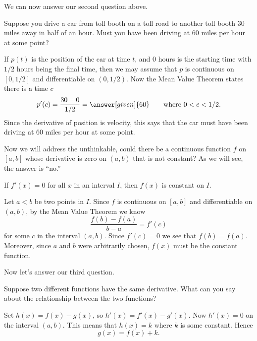 \documentclass{ximera}
\begin{document}
We can now answer our second question above.  

\begin{example}
Suppose you drive a car from toll booth on a toll road to another toll
booth $30$ miles away in half of an hour. Must you have been driving
at $60$ miles per hour at some point?

\begin{explanation}
If $p(t)$ is the position of the car at time $t$, and $0$ hours is the
starting time with $1/2$ hours being the final time, then we may
assume that $p$ is continuous on $[0,1/2]$ and differentiable on
$(0,1/2)$. Now the Mean Value Theorem states there is a time $c$
\[
p'(c) = \frac{30-0}{1/2} = \answer[given]{60}\qquad \text{where $0<c<1/2$.}
\]
Since the derivative of position is velocity, this says that the car
must have been driving at $60$ miles per hour at some point.
\end{explanation}
\end{example}

Now we will address the unthinkable, could there be a continuous
function $f$ on $[a,b]$ whose derivative is zero on $(a,b)$ that is
not constant? As we will see, the answer is ``no.''

\begin{theorem} 
If $f'(x)=0$ for all $x$ in an interval $I$, then $f(x)$ is constant
on $I$.
\begin{explanation}
Let $a< b$ be two points in $I$. Since $f$ is continuous on $[a,b]$
and differentiable on $(a,b)$, by the Mean Value Theorem we know
\[
\frac{f(b)-f(a)}{b-a} = f'(c)
\]
for some $c$ in the interval $(a,b)$. Since $f'(c)=0$ we see that
$f(b)=f(a)$. %
Moreover, since $a$ and $b$ were arbitrarily chosen,
$f(x)$ must be the constant function.
\end{explanation}
\end{theorem}


Now let's answer our third question.

\begin{example}
Suppose two different functions have the same derivative. What can you
say about the relationship between the two functions?

\begin{explanation}
Set $h(x) = f(x) - g(x)$, so $h'(x) = f'(x) -g'(x)$. Now $h'(x) = 0$
on the interval $(a,b)$. This means that $h(x) = k$ where $k$ is some
constant. Hence
\[
g(x) = f(x) + k.
\]
\end{explanation}
\end{example}
\end{document}
